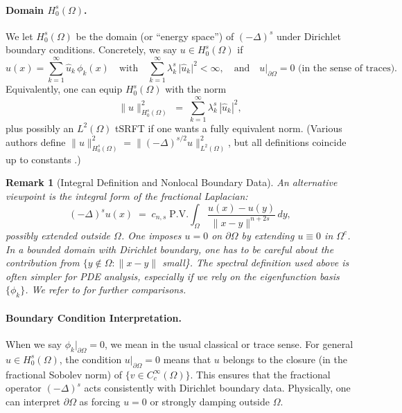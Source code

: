 \documentclass[12pt]{article}
\newtheorem{remark}[theorem]{Remark}
\begin{document}
\paragraph{Domain \(H_0^s(\Omega)\).}
We let \(H_0^s(\Omega)\) be the domain (or “energy space”) of \((- \Delta)^s\) under
Dirichlet boundary conditions.  Concretely, we say \(u\in H_0^s(\Omega)\) if
\[
u(x) 
= \sum_{k=1}^\infty \hat{u}_k\,\phi_k(x)
\quad\text{with}\quad
\sum_{k=1}^\infty \lambda_k^s\,\lvert \hat{u}_k\rvert^2 < \infty,
\quad
\text{and}\quad
u\big|_{\partial\Omega} = 0 \text{ (in the sense of traces).}
\]
Equivalently, one can equip \(H_0^s(\Omega)\) with the norm
\[
\|u\|_{H_0^s(\Omega)}^2
\;=\;
\sum_{k=1}^\infty
  \lambda_k^s \,|\hat{u}_k|^2,
\]
plus possibly an \(L^2(\Omega)\) tSRFT if one wants a fully equivalent norm.  
(Various authors define 
\(\|u\|_{H_0^s(\Omega)}^2 = \|(-\Delta)^{s/2} u\|_{L^2(\Omega)}^2\), 
but all definitions coincide up to constants \cite{DiNezzaPalatucciValdinoci}.)  

\begin{remark}[Integral Definition and Nonlocal Boundary Data]
An alternative viewpoint is the \emph{integral form} of the fractional Laplacian: 
\[
(-\Delta)^s u(x)
\;=\;
c_{n,s}
\;\mathrm{P.V.}
\int_{\Omega} 
  \frac{u(x) - u(y)}{\|x-y\|^{n+2s}}
\,dy,
\]
possibly extended outside \(\Omega\).  One imposes \(u=0\) on \(\partial\Omega\) by 
extending \(u\equiv 0\) in \(\Omega^c\). In a bounded domain with Dirichlet boundary, 
one has to be careful about the contribution from 
\(\{y\notin \Omega\colon \|x-y\|\) small\}. The \emph{spectral} definition used above is 
often simpler for PDE analysis, especially if we rely on the eigenfunction basis 
\(\{\phi_k\}\).  We refer to \cite{DiNezzaPalatucciValdinoci,Kilbas2006} for further 
comparisons.
\end{remark}

\paragraph{Boundary Condition Interpretation.}
When we say \(\phi_k\big|_{\partial\Omega}=0\), we mean in the usual classical or trace sense. 
For general \(u\in H_0^s(\Omega)\), the condition \(u|_{\partial\Omega}=0\) means that 
\(u\) belongs to the closure (in the fractional Sobolev norm) of 
\(\{v\in C_c^\infty(\Omega)\}\).  This ensures that the fractional operator \((- \Delta)^s\)
acts consistently with Dirichlet boundary data.  Physically, one can interpret 
\(\partial\Omega\) as forcing \(u=0\) or strongly damping outside \(\Omega\).
\end{document}
